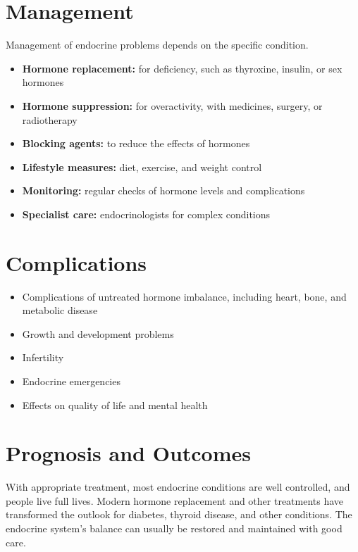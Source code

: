 \section*{Management}
Management of endocrine problems depends on the specific condition.
\begin{itemize}
    \item \textbf{Hormone replacement:} for deficiency, such as thyroxine, insulin, or sex hormones
    \item \textbf{Hormone suppression:} for overactivity, with medicines, surgery, or radiotherapy
    \item \textbf{Blocking agents:} to reduce the effects of hormones
    \item \textbf{Lifestyle measures:} diet, exercise, and weight control
    \item \textbf{Monitoring:} regular checks of hormone levels and complications
    \item \textbf{Specialist care:} endocrinologists for complex conditions
\end{itemize}

\section*{Complications}
\begin{itemize}
    \item Complications of untreated hormone imbalance, including heart, bone, and metabolic disease
    \item Growth and development problems
    \item Infertility
    \item Endocrine emergencies
    \item Effects on quality of life and mental health
\end{itemize}

\section*{Prognosis and Outcomes}
With appropriate treatment, most endocrine conditions are well controlled, and people live full lives. Modern hormone replacement and other treatments have transformed the outlook for diabetes, thyroid disease, and other conditions. The endocrine system's balance can usually be restored and maintained with good care.

